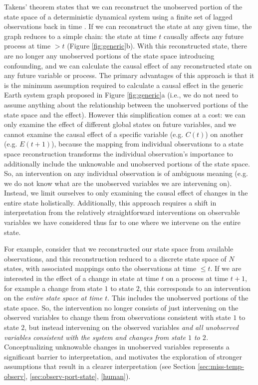 \documentclass[12pt]{article}
\begin{document}
Takens' theorem states that we can reconstruct the unobserved portion
of the state space of a deterministic dynamical system using a finite
set of lagged observations back in time
\citep{takens1981detecting,deyle2011generalized,Sugihara496}. If we
can reconstruct the state at any given time, the graph reduces to a
simple chain: the state at time $t$ causally affects any future
process at time $> t$ (Figure \ref{fig:generic}b). With this reconstructed
state, there are no longer any unobserved portions of the state space
introducing confounding, and we can calculate the causal effect of any
reconstructed state on any future variable or process. The primary
advantages of this approach is that it is the minimum assumption
required to calculate a causal effect in the generic Earth system
graph proposed in Figure \ref{fig:generic}a (i.e., we do not need to
assume anything about the relationship between the unobserved portions
of the state space and the effect). However this simplification comes
at a cost: we can only examine the effect of different global states
on future variables, and we cannot examine the causal effect of a
specific variable (e.g. $C(t)$) on another (e.g. $E(t+1)$), because
the mapping from individual observations to a state space
reconstruction transforms the individual observation's importance to
additionally include the unknowable and unobserved portions of the
state space. So, an intervention on any individual observation is of
ambiguous meaning (e.g. we do not know what are the unobserved
variables we are intervening on). Instead, we limit ourselves to only
examining the causal effect of changes in the entire state
holistically. Additionally, this approach requires a shift in
interpretation from the relatively straightforward interventions on
observable variables we have considered thus far to one where we
intervene on the entire state.

For example, consider that we reconstructed our state space from
available observations, and this reconstruction reduced to a discrete
state space of $N$ states, with associated mappings onto the
observations at time $\leq t$. If we are interested in the effect of a
change in state at time $t$ on a process at time $t+1$, for example a
change from state $1$ to state $2$, this corresponds to an
intervention on the \textit{entire state space at time $t$}. This
includes the unobserved portions of the state space. So, the
intervention no longer consists of just intervening on the observed
variables to change them from observations consistent with state $1$
to state $2$, but instead intervening on the observed variables
\emph{and all unobserved variables consistent with the system and
  changes from state $1$ to $2$.}  Conceptualizing unknowable changes
in unobserved variables represents a significant barrier to
interpretation, and motivates the exploration of stronger assumptions
that result in a clearer interpretation (see Section
\ref{sec:miss-temp-observ}, \ref{sec:observ-port-state}, \ref{human}).
\end{document}
